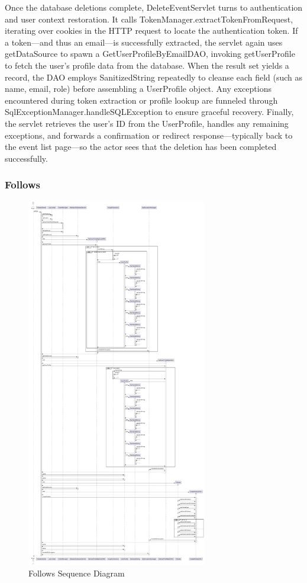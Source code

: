 Once the database deletions complete, DeleteEventServlet turns to authentication and user context restoration. It calls TokenManager.extractTokenFromRequest, iterating over cookies in the HTTP request to locate the authentication token. If a token—and thus an email—is successfully extracted, the servlet again uses getDataSource to spawn a GetUserProfileByEmailDAO, invoking getUserProfile to fetch the user’s profile data from the database. When the result set yields a record, the DAO employs SanitizedString repeatedly to cleanse each field (such as name, email, role) before assembling a UserProfile object. Any exceptions encountered during token extraction or profile lookup are funneled through SqlExceptionManager.handleSQLException to ensure graceful recovery. Finally, the servlet retrieves the user’s ID from the UserProfile, handles any remaining exceptions, and forwards a confirmation or redirect response—typically back to the event list page—so the actor sees that the deletion has been completed successfully.


\subsubsection{Follows}
\begin{figure}[H]
    \centering
    \includegraphics[width=0.7\textwidth]{images/sequence_diagrams/Follows.pdf}
    \caption{Follows Sequence Diagram}
\end{figure}

